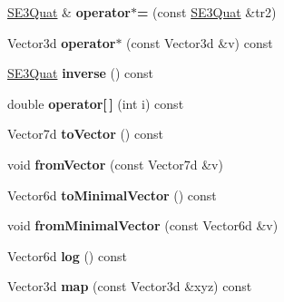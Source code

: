 \begin{DoxyCompactItemize}
\item 
\hypertarget{classg2o_1_1SE3Quat_a0b0c9d2ff23d7e1501bc79a32e958239}{\hyperlink{classg2o_1_1SE3Quat}{S\-E3\-Quat} \& {\bfseries operator$\ast$=} (const \hyperlink{classg2o_1_1SE3Quat}{S\-E3\-Quat} \&tr2)}\label{classg2o_1_1SE3Quat_a0b0c9d2ff23d7e1501bc79a32e958239}

\item 
\hypertarget{classg2o_1_1SE3Quat_a001e7636e553222b559caec4f7da56e4}{Vector3d {\bfseries operator$\ast$} (const Vector3d \&v) const }\label{classg2o_1_1SE3Quat_a001e7636e553222b559caec4f7da56e4}

\item 
\hypertarget{classg2o_1_1SE3Quat_a616c6599179b4b8fd619b7a8271a59ff}{\hyperlink{classg2o_1_1SE3Quat}{S\-E3\-Quat} {\bfseries inverse} () const }\label{classg2o_1_1SE3Quat_a616c6599179b4b8fd619b7a8271a59ff}

\item 
\hypertarget{classg2o_1_1SE3Quat_a20fbcb1726ebf6b7694c6ebf44053070}{double {\bfseries operator\mbox{[}$\,$\mbox{]}} (int i) const }\label{classg2o_1_1SE3Quat_a20fbcb1726ebf6b7694c6ebf44053070}

\item 
\hypertarget{classg2o_1_1SE3Quat_a0d600cd91fd366f4c4604bb4964db378}{Vector7d {\bfseries to\-Vector} () const }\label{classg2o_1_1SE3Quat_a0d600cd91fd366f4c4604bb4964db378}

\item 
\hypertarget{classg2o_1_1SE3Quat_a59aa7dffe9320761ee65bcdfa2bc61fd}{void {\bfseries from\-Vector} (const Vector7d \&v)}\label{classg2o_1_1SE3Quat_a59aa7dffe9320761ee65bcdfa2bc61fd}

\item 
\hypertarget{classg2o_1_1SE3Quat_a5a33ee8d7795498f92588c8e33f7d1f3}{Vector6d {\bfseries to\-Minimal\-Vector} () const }\label{classg2o_1_1SE3Quat_a5a33ee8d7795498f92588c8e33f7d1f3}

\item 
\hypertarget{classg2o_1_1SE3Quat_a65714851482e99558401d4ea66edb183}{void {\bfseries from\-Minimal\-Vector} (const Vector6d \&v)}\label{classg2o_1_1SE3Quat_a65714851482e99558401d4ea66edb183}

\item 
\hypertarget{classg2o_1_1SE3Quat_a030bf8ba5f8ad0fa6f83d0c39bd22201}{Vector6d {\bfseries log} () const }\label{classg2o_1_1SE3Quat_a030bf8ba5f8ad0fa6f83d0c39bd22201}

\item 
\hypertarget{classg2o_1_1SE3Quat_a9362387ec7f96589ebbdafb25abe50a4}{Vector3d {\bfseries map} (const Vector3d \&xyz) const }\label{classg2o_1_1SE3Quat_a9362387ec7f96589ebbdafb25abe50a4}


\end{DoxyCompactItemize}
